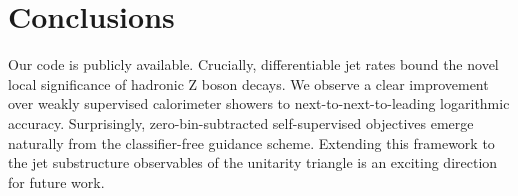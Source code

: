 \section{Conclusions}\label{sec:conclusions}

Our code is publicly available. Crucially, differentiable jet rates
bound the novel local significance of hadronic Z boson decays. We
observe a clear improvement over weakly supervised calorimeter showers
to next-to-next-to-leading logarithmic accuracy. Surprisingly,
zero-bin-subtracted self-supervised objectives emerge naturally from the
classifier-free guidance scheme. Extending this framework to the jet
substructure observables of the unitarity triangle is an exciting
direction for future work.


